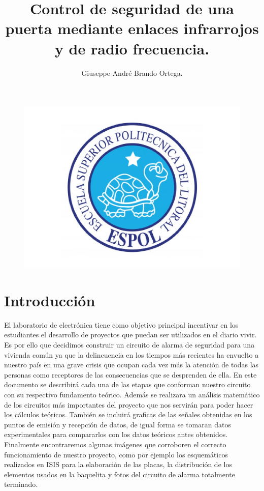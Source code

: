 \documentclass[a4paper,11pt]{article}
\begin{document}
\author{
	Giuseppe André Brando Ortega.
}
\title{Control de seguridad de una puerta mediante enlaces infrarrojos y de radio frecuencia.}
\maketitle
\begin{figure}[h]
\centering
\includegraphics[width=0.7\linewidth]{./logo}
\end{figure}


\newpage

\section{Introducción}
El laboratorio de electrónica tiene como objetivo principal incentivar en los estudiantes el desarrollo de proyectos que puedan ser utilizados en el diario vivir. Es por ello que decidimos construir un circuito de alarma de seguridad para una vivienda común ya que la delincuencia en los tiempos más recientes ha envuelto a nuestro país en una grave crisis  que  ocupan  cada  vez  más   la  atención  de   todas   las  personas  como receptores de las consecuencias que se desprenden de ella. 
En este documento se describirá cada una de las etapas que conforman nuestro circuito con su respectivo fundamento teórico. Además se realizara un análisis matemático de los circuitos más importantes del proyecto que nos servirán para poder hacer los cálculos teóricos. 
También se incluirá graficas de las señales obtenidas en los puntos de emisión y recepción de datos, de igual forma se tomaran datos experimentales para compararlos con los datos teóricos antes obtenidos.
Finalmente encontraremos algunas imágenes que corroboren el correcto funcionamiento de nuestro proyecto, como por ejemplo los esquemáticos realizados en ISIS para la elaboración de las placas, la distribución de los elementos usados en la baquelita y fotos del circuito de alarma totalmente terminado.
\end{document}
